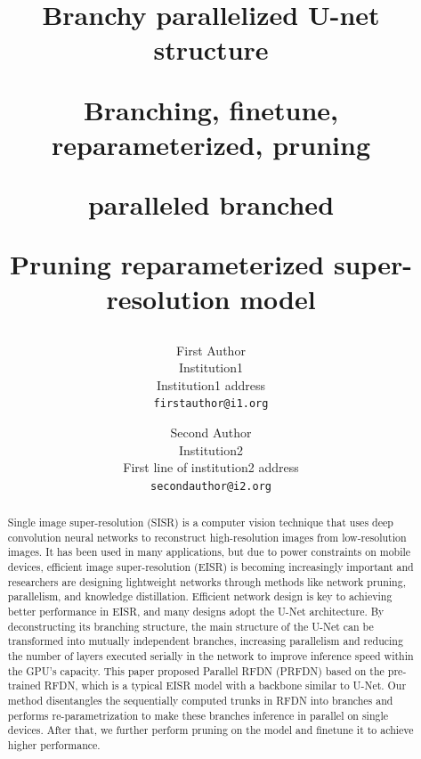 \documentclass[10pt,twocolumn,letterpaper]{article}
\begin{document}
\title{Branchy parallelized U-net structure 

Branching, finetune, reparameterized, pruning

paralleled 
branched

Pruning reparameterized super-resolution model}

\author{First Author\\
Institution1\\
Institution1 address\\
{\tt\small firstauthor@i1.org}
\and
Second Author\\
Institution2\\
First line of institution2 address\\
{\tt\small secondauthor@i2.org}
}
\maketitle

\begin{abstract}
  Single image super-resolution (SISR) is a computer vision technique that uses deep convolution neural networks to reconstruct high-resolution images from low-resolution images. It has been used in many applications, but due to power constraints on mobile devices, efficient image super-resolution (EISR) is becoming increasingly important and researchers are designing lightweight networks through methods like network pruning, parallelism, and knowledge distillation.
  Efficient network design is key to achieving better performance in EISR, and many designs adopt the U-Net architecture. By deconstructing its branching structure, the main structure of the U-Net can be transformed into mutually independent branches, increasing parallelism and reducing the number of layers executed serially in the network to improve inference speed within the GPU's capacity.
  This paper proposed Parallel RFDN (PRFDN) based on the pre-trained RFDN, which is a typical EISR model with a backbone similar to U-Net. 
  Our method disentangles the sequentially computed trunks in RFDN into branches and performs re-parametrization to make these branches inference in parallel on single devices. 
  After that, we further perform pruning on the model and finetune it to achieve higher performance.
\end{abstract}
\end{document}
